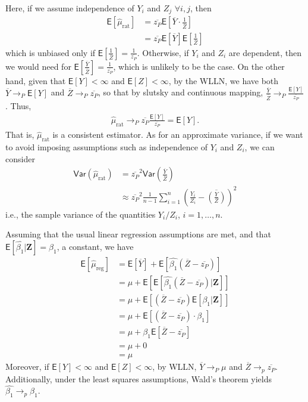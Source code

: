 \documentclass[11pt]{article}
\newcommand*\mean[1]{\overline{#1}}
\newcommand*\ba{\[ \begin{aligned}}
\newcommand*\ea{\end{aligned} \]}
\newcommand*\E[1]{\mathsf{E}\left[#1\right]}
\newcommand*\Var[1]{\mathsf{Var}\left(#1\right)}
\newcommand*\estim[1]{\widehat{#1}}
\newcommand*\bZ{\mathbf{Z}}
\renewcommand\;{\,}
\begin{document}
\item
    Here, if we assume independence of $Y_i$ and $Z_j$ $\forall i, j$, then
    \ba
    \E{\estim{\mu}_\text{rat}} & = \overline{z_P} 
        \E{\overline{Y} \cdot \frac{1}{\overline{Z}} } \\
        & = \overline{z_P} \E{\overline{Y}} \E{\frac{1}{\overline{Z}}} 
    \ea
which is unbiased only if $\E{\frac{1}{\overline{Z}}} = \frac{1}{\overline{z_P}}$.
Otherwise, if $Y_i$ and $Z_i$ are dependent, then we would need for 
$\E{\frac{\overline{Y}}{\overline{Z}}} = \frac{1}{\overline{z_P}}$, which is unlikely to be the case. 
On the other hand, given that $\E{Y} < \infty$ and $\E{Z} < \infty$, by the WLLN, we have both $\overline{Y} \to_P \E{Y}$ and 
$\overline{Z} \to_P \overline{z_P}$, so that by slutsky and continuous mapping,
$\frac{\overline{Y}}{\overline{Z}} \to_P \frac{\E{Y}}{\overline{z_P}}$. 
Thus,
\ba
\estim{\mu}_\text{rat} \to_P \overline{z_P} \frac{ \E{Y} }{\overline{z_P}} 
    = \E{Y}.
\ea
That is, $\estim{\mu}_\text{rat}$ is a consistent estimator.
As for an approximate variance, if we want to avoid imposing assumptions such as independence of $Y_i$ and $Z_i$, we can consider
\ba
\Var{\estim{\mu}_\text{rat}} 
& = \overline{z_P}^2 \Var{ \frac{\mean{Y}}{\mean{Z}} } \\
& \approx \mean{z_P}^2 \frac{1}{n - 1} 
\sum_{i=1}^n \left( \frac{Y_i}{Z_i} - \mean{\left(\frac{Y}{Z}\right)} \right)^2
\ea
i.e., the sample variance of the quantities $Y_i/Z_i$, $i = 1, \dotsc, n$.
\item
    Assuming that the usual linear regression assumptions are met, and that 
    $\E{\estim{\beta_1} | \bZ} = \beta_1$, a constant, we have
    \ba
        \E{\estim{\mu}_\text{reg}}
        & = \E{\overline{Y}} + \E{\estim{\beta_1} 
    \left(\overline{Z} - \overline{z_P}\right)} \\
    & = \mu + \E{\E{ \estim{\beta_1} (\overline{Z} - \overline{z_P}) | \bZ } } \\
    & = \mu + \E{ \left(\overline{Z} - \overline{z_P}\right) \E{ \beta_1 | \bZ } } \\
    & = \mu + \E{\left(\overline{Z} - \overline{z_P}\right) \cdot \beta_1 } \\
    & = \mu + \beta_1 \E{ \overline{Z} - \overline{z_P} } \\
    & = \mu + 0 \\
    & = \mu
    \ea
    Moreover, if $\E{Y} < \infty$ and $\E{Z} < \infty$, by WLLN, $\mean{Y} \to_P \mu$ and $\mean{Z} \to_p \mean{z_P}$. Additionally, under the least squares assumptions, Wald's theorem yields $\estim{\beta_1} \to_p \beta_1$.
\end{document}
